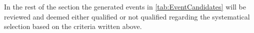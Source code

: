 In the rest of the section the generated events in \cref{tab:EventCandidates} will be reviewed and deemed either qualified or not qualified regarding the systematical selection based on the criteria written above.



